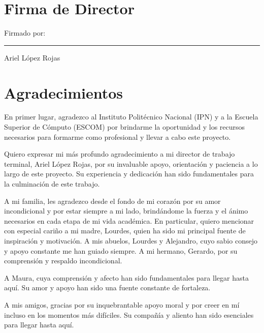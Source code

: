 \documentclass[12pt, a4paper, titlepage]{report} %
\begin{document}
  \section*{\textcolor{azulescom}{Firma de Director}}
  \vfill
  \noindent
  \parbox[b]{0.4\linewidth}{
    \strut
    Firmado por: \\[3cm]
    \hrule
    \vspace*{0.1in}
    Ariel López Rojas}
  \hfill
  \vfill
  \newpage

\section*{\textcolor{azulescom}{Agradecimientos}}

{\setlength{\parindent}{15pt}
\indent En primer lugar, agradezco al Instituto Politécnico Nacional (IPN) y a
la Escuela Superior de Cómputo (ESCOM) por brindarme la oportunidad y los
recursos necesarios para formarme como profesional y llevar a cabo este proyecto.}

Quiero expresar mi más profundo agradecimiento a mi director de trabajo terminal,
Ariel López Rojas, por su invaluable apoyo, orientación y paciencia a lo largo
de este proyecto. Su experiencia y dedicación han sido fundamentales para la
culminación de este trabajo.

A mi familia, les agradezco desde el fondo de mi corazón por su amor
incondicional y por estar siempre a mi lado, brindándome la fuerza y el ánimo
necesarios en cada etapa de mi vida académica. En particular, quiero mencionar
con especial cariño a mi madre, Lourdes, quien ha sido mi principal
fuente de inspiración y motivación. A mis abuelos, Lourdes y Alejandro, cuyo
sabio consejo y apoyo constante me han guiado siempre. A mi hermano, Gerardo,
por su comprensión y respaldo incondicional.

A Maura, cuya comprensión y afecto han sido fundamentales para llegar
hasta aquí. Su amor y apoyo han sido una fuente constante de fortaleza.

A mis amigos, gracias por su inquebrantable apoyo moral y por
creer en mí incluso en los momentos más difíciles. Su compañía y aliento han
sido esenciales para llegar hasta aquí.
\end{document}
